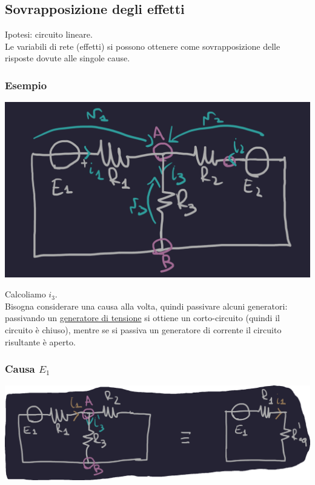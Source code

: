 \documentclass{article}
\begin{document}
\subsection{Sovrapposizione degli effetti}
Ipotesi: circuito lineare.\\
Le variabili di rete (effetti) si possono ottenere come sovrapposizione delle risposte dovute alle singole cause.

\subsubsection{Esempio}
\begin{center}
    \includegraphics[scale=0.2]{Image/Esempio_MetAnalisi_1.png}
\end{center}
Calcoliamo $i_3$.\\
Bisogna considerare una causa alla volta, quindi passivare alcuni generatori: passivando un \underline{generatore di tensione} si ottiene un corto-circuito (quindi il circuito è chiuso), mentre se si passiva un generatore di corrente il circuito risultante è aperto. 
\subsubsection*{Causa \texorpdfstring{$E_1$}{E1}}
\begin{center}
    \includegraphics[scale=0.25]{Image/Esempio_MetAnal_2.png}
\end{center}
\end{document}
